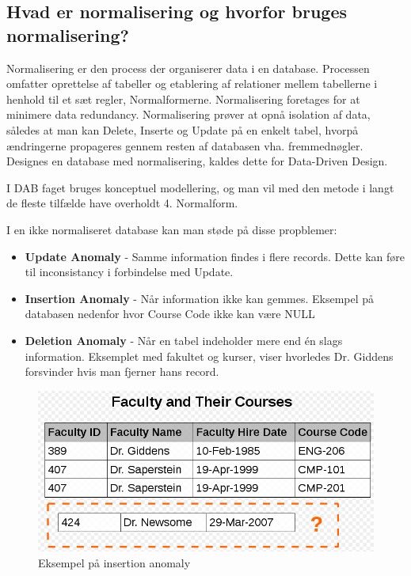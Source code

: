 \newpage

\subsection{Hvad er normalisering og hvorfor bruges normalisering?}\label{sec:normal}
Normalisering er den process der organiserer data i en database. Processen omfatter oprettelse af tabeller og etablering af relationer mellem tabellerne i henhold til et sæt regler, Normalformerne. Normalisering foretages for at minimere data redundancy. Normalisering prøver at opnå isolation af data, således at man kan Delete, Inserte og Update på en enkelt tabel, hvorpå ændringerne propageres gennem resten af databasen vha. fremmednøgler. Designes en database med normalisering, kaldes dette for Data-Driven Design.

I DAB faget bruges konceptuel modellering, og man vil med den metode i langt de fleste tilfælde have overholdt 4. Normalform.

I en ikke normaliseret database kan man støde på disse propblemer:

\begin{itemize}
	\item \textbf{Update Anomaly} - Samme information findes i flere records. Dette kan føre til inconsistancy i forbindelse med Update.
	\item \textbf{Insertion Anomaly} - Når information ikke kan gemmes. Eksempel på databasen nedenfor hvor Course Code ikke kan være NULL
	\item \textbf{Deletion Anomaly} - Når en tabel indeholder mere end én slags information. Eksemplet med fakultet og kurser, viser hvorledes Dr. Giddens forsvinder hvis man fjerner hans record.	
\end{itemize}

\begin{figure}[H]
	\centering
	\includegraphics[width=0.7\linewidth]{figs/spm5/insertionAnomaly.PNG}
	\caption{Eksempel på insertion anomaly}
	\label{fig:insertionAnomaly}
\end{figure}

